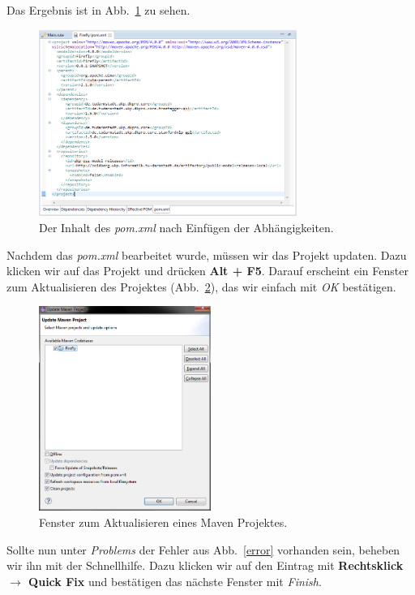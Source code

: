 \documentclass{article}
\begin{document}
Das Ergebnis ist in Abb.~\ref{pom2} zu sehen.

\begin{figure}
\centering
\includegraphics[width=0.75\textwidth]{figs/tt_pom2.png}
\caption{Der Inhalt des \textit{pom.xml} nach Einfügen der Abhängigkeiten.}
\label{pom2}
\end{figure}

Nachdem das \textit{pom.xml} bearbeitet wurde, müssen wir das Projekt updaten. Dazu klicken wir auf das Projekt und drücken \textbf{Alt + F5}. Darauf erscheint ein Fenster zum Aktualisieren des Projektes (Abb.~\ref{update}), das wir einfach mit \textit{OK} bestätigen.

\begin{figure}
\centering
\includegraphics[width=0.5\textwidth]{figs/tt_maven.png}
\caption{Fenster zum Aktualisieren eines Maven Projektes.}
\label{update}
\end{figure}

Sollte nun unter \textit{Problems} der Fehler aus Abb.~\ref{error} vorhanden sein, beheben wir ihn mit der Schnellhilfe. Dazu klicken wir auf den Eintrag mit \textbf{Rechtsklick $\rightarrow$ Quick Fix} und bestätigen das nächste Fenster mit \textit{Finish}.
\end{document}
